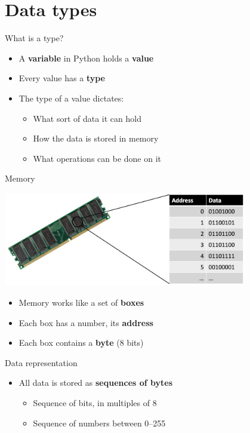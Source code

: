 \part{Data types}
\frame{\partpage}

\begin{frame}{What is a type?}
	\begin{itemize}
		\pause\item A \textbf{variable} in Python holds a \textbf{value}
		\pause\item Every value has a \textbf{type}
		\pause\item The type of a value dictates:
			\begin{itemize}
				\pause\item What sort of data it can hold
				\pause\item How the data is stored in memory
				\pause\item What operations can be done on it
			\end{itemize}
	\end{itemize}
\end{frame}

\begin{frame}{Memory}
	\pause
	\begin{center}
		\includegraphics[width=0.8\textwidth]{memory}
	\end{center}
	\begin{itemize}
		\item Memory works like a set of \textbf{boxes}
		\pause\item Each box has a number, its \textbf{address}
		\pause\item Each box contains a \textbf{byte} (8 bits)
	\end{itemize}
\end{frame}

\begin{frame}{Data representation} 
	\begin{itemize}
		\pause\item All data is stored as \textbf{sequences of bytes}
			\begin{itemize}
				\pause\item Sequence of bits, in multiples of 8
				\pause\item Sequence of numbers between 0--255
			\end{itemize}
	\end{itemize}
\end{frame}


